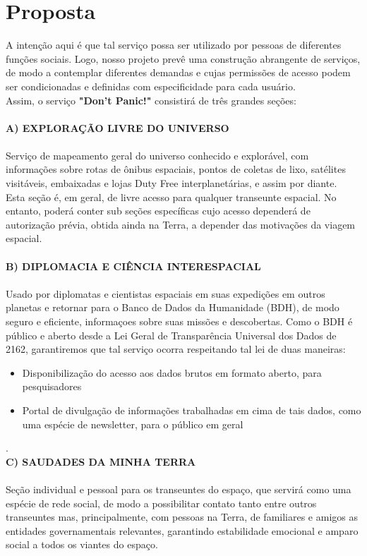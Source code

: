 \documentclass[12pt]{exam}
\begin{document}
\section{Proposta}

	A intenção aqui é que tal serviço possa ser utilizado por pessoas de diferentes funções sociais. Logo, nosso projeto prevê uma construção abrangente de serviços, de modo a contemplar diferentes demandas e cujas permissões de acesso podem ser condicionadas e definidas com especificidade para cada usuário. 
	\\ Assim, o serviço \textbf{"Don't Panic!"} consistirá de três grandes seções:
	\\
    \\\textbf{A) EXPLORAÇÃO LIVRE DO UNIVERSO} 
    \\ \\ Serviço de mapeamento geral do universo conhecido e explorável, com informações sobre rotas de ônibus espaciais, pontos de coletas de lixo, satélites visitáveis, embaixadas e lojas Duty Free interplanetárias, e assim por diante. 
		\\ Esta seção é, em geral, de livre acesso para qualquer transeunte espacial. No entanto, poderá conter sub seções específicas cujo acesso dependerá de autorização prévia, obtida ainda na Terra, a depender das motivações da viagem espacial.
    \\ 
    \\\textbf{B) DIPLOMACIA E CIÊNCIA INTERESPACIAL}
    \\ \\ Usado por diplomatas e cientistas espaciais em suas expedições em outros planetas e retornar para o Banco de Dados da Humanidade (BDH), de modo seguro e eficiente, informaçoes sobre suas missões e descobertas. Como o BDH é público e aberto desde a Lei Geral de Transparência Universal dos Dados de 2162, garantiremos que tal serviço ocorra respeitando tal lei de duas maneiras: 
	\\
\begin{itemize}
\item {Disponibilização do acesso aos dados brutos em formato aberto, para pesquisadores}
\item {Portal de divulgação de informações trabalhadas em cima de tais dados, como uma espécie de newsletter, para o público em geral}
\end{itemize}
.
	\\\textbf{C) SAUDADES DA MINHA TERRA}
    \\ \\ Seção individual e pessoal para os transeuntes do espaço, que servirá como uma espécie de rede social, de modo a possibilitar contato tanto entre outros transeuntes mas, principalmente, com pessoas na Terra, de familiares e amigos as entidades governamentais relevantes, garantindo estabilidade emocional e amparo social a todos os viantes do espaço. 
\end{document}
